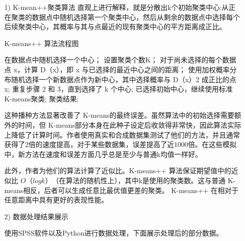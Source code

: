 \documentclass[UTF8]{ctexart}
\begin{document}
\begin{itemize}
	\item [1)] K-mean++聚类算法
	      直观上进行解释，就是分散出k个初始聚类中心:从正在聚类的数据点中随机选择第一个聚类中心，然后从剩余的数据点中选择每个后续聚类中心，其概率与其与点最近的现有聚类中心的平方距离成正比。
	      \begin{algorithm}[htb]
		      \caption{ K-means++ 算法流程图}
		      \label{alg:Framwork}
		      \begin{algorithmic}[1]
			      \Require
			      \State 在数据点中随机选择一个中心；
			      \State 设置聚类个数K；
			      \Ensure
			      \State 对于尚未选择的每个数据点 x，计算 D（x），即 x 与已选择的最近中心之间的距离；
			      \State 使用加权概率分布随机选择一个新数据点作为新中心，其中选择概率与 D（x）2 成正比的点 x;
			      \State 重复步骤 2 和 3，直到选择了 k 个中心;
			      \State 已选择初始中心，继续使用标准 K-means聚类;
			      \Return 聚类结果;
		      \end{algorithmic}
	      \end{algorithm}
	      这种播种方法显著改善了 K-means的最终误差。虽然算法中的初始选择需要额外的时间，但 K-means部分本身在此种子设定后收敛得非常快，因此算法实际上降低了计算时间。作者使用真实和合成数据集测试了他们的方法，并且通常获得了2倍的速度提高，对于某些数据集，误差提高了近1000倍。在这些模拟中，新方法在速度和误差方面几乎总是至少与普通k均值一样好。

	      此外，作者为他们的算法计算了近似比。K-means++ 算法保证期望值中的近似比 $O（log k）$（在算法的随机性上），其中k是使用的聚类数。这与普通 K-means相反，后者可以生成任意比最优值更差的聚类\cite{kanungo2004local}。 K-means++ 在相对于任意距离中具有更好的表现性能。

	\item [2)] 数据处理结果展示

	      使用SPSS软件以及Python进行数据处理，下面展示处理后的部分数据。


\end{itemize}
\end{document}
